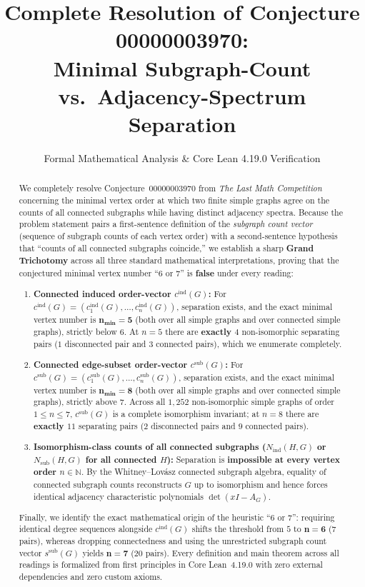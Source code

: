 \documentclass[11pt]{article}
\title{\textbf{Complete Resolution of Conjecture 00000003970:\\
Minimal Subgraph-Count vs.\ Adjacency-Spectrum Separation}}
\author{Formal Mathematical Analysis \& Core Lean 4.19.0 Verification}
\date{}
\theoremstyle{definition}
\newcommand{\cind}{c^{\mathrm{ind}}}
\newcommand{\csub}{c^{\mathrm{sub}}}
\newcommand{\ssub}{s^{\mathrm{sub}}}
\newcommand{\Nind}{N_{\mathrm{ind}}}
\newcommand{\Nsub}{N_{\mathrm{sub}}}
\begin{document}
\maketitle

\begin{abstract}
We completely resolve Conjecture~00000003970 from \emph{The Last Math Competition} concerning the minimal vertex order at which two finite simple graphs agree on the counts of all connected subgraphs while having distinct adjacency spectra. Because the problem statement pairs a first-sentence definition of the \emph{subgraph count vector} (sequence of subgraph counts of each vertex order) with a second-sentence hypothesis that ``counts of all connected subgraphs coincide,'' we establish a sharp \textbf{Grand Trichotomy} across all three standard mathematical interpretations, proving that the conjectured minimal vertex number ``$6$ or $7$'' is \textbf{false} under every reading:
\begin{enumerate}
  \item \textbf{Connected induced order-vector $\cind(G)$:} For $\cind(G) = (\cind_1(G), \dots, \cind_n(G))$, separation exists, and the exact minimal vertex number is $\mathbf{n_{\min} = 5}$ (both over all simple graphs and over connected simple graphs), strictly below $6$. At $n = 5$ there are \textbf{exactly $4$} non-isomorphic separating pairs ($1$ disconnected pair and $3$ connected pairs), which we enumerate completely.
  \item \textbf{Connected edge-subset order-vector $\csub(G)$:} For $\csub(G) = (\csub_1(G), \dots, \csub_n(G))$, separation exists, and the exact minimal vertex number is $\mathbf{n_{\min} = 8}$ (both over all simple graphs and over connected simple graphs), strictly above $7$. Across all $1{,}252$ non-isomorphic simple graphs of order $1 \le n \le 7$, $\csub(G)$ is a complete isomorphism invariant; at $n = 8$ there are \textbf{exactly $11$} separating pairs ($2$ disconnected pairs and $9$ connected pairs).
  \item \textbf{Isomorphism-class counts of all connected subgraphs ($\Nind(H,G)$ or $\Nsub(H,G)$ for all connected $H$):} Separation is \textbf{impossible at every vertex order $n \in \mathbb{N}$}. By the Whitney--Lov\'asz connected subgraph algebra, equality of connected subgraph counts reconstructs $G$ up to isomorphism and hence forces identical adjacency characteristic polynomials $\det(xI - A_G)$.
\end{enumerate}
Finally, we identify the exact mathematical origin of the heuristic ``$6$ or $7$'': requiring identical degree sequences alongside $\cind(G)$ shifts the threshold from $5$ to $\mathbf{n = 6}$ ($7$ pairs), whereas dropping connectedness and using the unrestricted subgraph count vector $\ssub(G)$ yields $\mathbf{n = 7}$ ($20$ pairs). Every definition and main theorem across all readings is formalized from first principles in Core Lean~4.19.0 with zero external dependencies and zero custom axioms.
\end{abstract}
\end{document}
